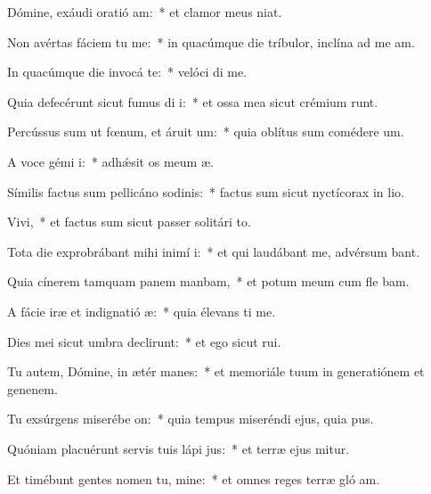 \item Dómine, exáudi oratió am:~* et clamor meus   niat.
\item Non avértas fáciem tu  me:~* in quacúmque die tríbulor, inclína ad me  am.
\item In quacúmque die invocá te:~* velóci di me.
\item Quia defecérunt sicut fumus di i:~* et ossa mea sicut crémium runt.
\item Percússus sum ut fœnum, et áruit  um:~* quia oblítus sum comédere  um.
\item A voce gémi i:~* adhǽsit os meum  æ.
\item Símilis factus sum pellicáno sodinis:~* factus sum sicut nyctícorax in lio.
\item Vivi,~* et factus sum sicut passer solitári  to.
\item Tota die exprobrábant mihi inimí i:~* et qui laudábant me, advérsum  bant.
\item Quia cínerem tamquam panem manbam,~* et potum meum cum fle bam.
\item A fácie iræ et indignatió æ:~* quia élevans ti me.
\item Dies mei sicut umbra declirunt:~* et ego sicut  rui.
\item Tu autem, Dómine, in ætér manes:~* et memoriále tuum in generatiónem et genenem.
\item Tu exsúrgens miserébe on:~* quia tempus miseréndi ejus, quia  pus.
\item Quóniam placuérunt servis tuis lápi jus:~* et terræ ejus mitur.
\item Et timébunt gentes nomen tu, mine:~* et omnes reges terræ gló am.
